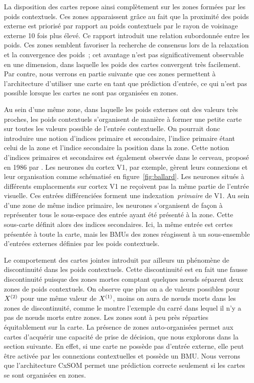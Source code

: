 \documentclass[../main]{subfiles}
\begin{document}
La disposition des cartes repose ainsi complètement sur les zones formées par les poids contextuels. Ces zones apparaissent grâce au fait que la proximité des poids externe est priorisé par rapport au poids contextuels par le rayon de voisinage externe 10 fois plus élevé. Ce rapport introduit une relation subordonnée entre les poids. 
Ces zones semblent favoriser la recherche de consensus lors de la relaxation et la convergence des poids~; cet avantage n'est pas significativement observable en une dimension, dans laquelle les poids des cartes convergent très facilement.
Par contre, nous verrons en partie suivante que ces zones permettent à l'architecture d'utiliser une carte en tant que prédiction d'entrée, ce qui n'est pas possible lorsque les cartes ne sont pas organisées en zones.


Au sein d'une même zone, dans laquelle les poids externes ont des valeurs très proches, les poids contextuels s'organisent de manière à former une petite carte sur toutes les valeurs possible de l'entrée contextuelle.
On pourrait donc introduire une notion d'indices primaire et secondaire, l'indice primaire étant celui de la zone et l'indice secondaire la position dans la zone.
Cette notion d'indices primaires et secondaires est également observée dans le cerveau, proposé en 1986 par \cite{ballard_cortical_1986}. Les neurones du cortex V1, par exemple, gèrent leurs connexions et leur organisation comme schématisé en figure~\ref{fig:ballard}.
Les neurones situés à différents emplacements sur cortex V1 ne reçoivent pas la même partie de l'entrée visuelle. Ces entrées différenciées forment une indexation~\emph{primaire} de V1. Au sein d'une zone de même indice primaire, les neurones s'organisent de façon à représenter tous le sous-espace des entrée ayant été présenté à la zone. Cette sous-carte définit alors des indices secondaires.
Ici, la même entrée est certes présentée à toute la carte, mais les BMUs des zones réagissent à un sous-ensemble d'entrées externes définies par les poids contextuels.

Le comportement des cartes jointes introduit par ailleurs un phénomène de discontinuité dans les poids contextuels. Cette discontinuité est en fait une fausse discontinuité puisque des zones mortes comptant quelques n\oe{}uds séparent deux zones de poids contextuels.
On observe que plus on a de valeurs possibles pour $X^{({2})}$ pour une même valeur de $X^{({1})}$, moins on aura de n\oe{}uds morts dans les zones de discontinuité, comme le montre l'exemple du carré dans lequel il n'y a pas de n\oe{}uds morts entre zones.
Les zones sont à peu près réparties équitablement sur la carte.
La présence de zones auto-organisées permet aux cartes d'acquérir une capacité de prise de décision, que nous explorons dans la section suivante.
En effet, si une carte ne possède pas d'entrée externe, elle peut être activée par les connexions contextuelles et possède un BMU. Nous verrons que l'architecture CxSOM permet une prédiction correcte seulement si les cartes se sont organisées en zones.
\end{document}
